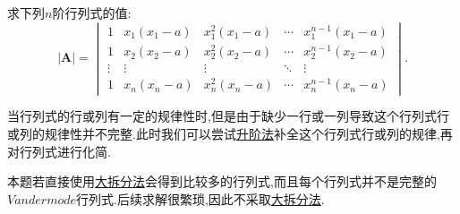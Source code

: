 \documentclass[../../main.tex]{subfiles}%
\begin{document}
\begin{example}
求下列\(n\)阶行列式的值:
\[
\left| \boldsymbol{A} \right| = 
\begin{vmatrix}
1 & x_1(x_1 - a) & x_1^2(x_1 - a) & \cdots & x_1^{n - 1}(x_1 - a)\\
1 & x_2(x_2 - a) & x_2^2(x_2 - a) & \cdots & x_2^{n - 1}(x_2 - a)\\
\vdots & \vdots & \vdots & \ddots & \vdots\\
1 & x_n(x_n - a) & x_n^2(x_n - a) & \cdots & x_n^{n - 1}(x_n - a)
\end{vmatrix}.
\]
\end{example}
\begin{note}
当行列式的行或列有一定的规律性时,但是由于缺少一行或一列导致这个行列式行或列的规律性并不完整.此时我们可以尝试\hyperlink{行列式计算:升阶法}{升阶法}补全这个行列式行或列的规律,再对行列式进行化简.

本题若直接使用\hyperref[大拆分法]{大拆分法}会得到比较多的行列式,而且每个行列式并不是完整的$Vandermode$行列式.后续求解很繁琐,因此不采取\hyperref[大拆分法]{大拆分法}.
\end{note}
\end{document}
